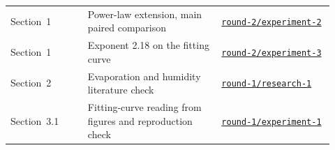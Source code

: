 \documentclass[11pt,letterpaper]{article}
\begin{document}
\begin{longtable}{p{0.22\linewidth}p{0.38\linewidth}p{0.32\linewidth}}
  Section~1 & Power-law extension, main paired comparison & \href{https://github.com/ai-inventor-papers/ai-invention-5821c4-newtons-cooling-law-for-coffee-over-30/tree/main/round-2/experiment-2}{\texttt{round-2/experiment-2}} \\
  Section~1 & Exponent 2.18 on the fitting curve & \href{https://github.com/ai-inventor-papers/ai-invention-5821c4-newtons-cooling-law-for-coffee-over-30/tree/main/round-2/experiment-3}{\texttt{round-2/experiment-3}} \\
  Section~2 & Evaporation and humidity literature check & \href{https://github.com/ai-inventor-papers/ai-invention-5821c4-newtons-cooling-law-for-coffee-over-30/tree/main/round-1/research-1}{\texttt{round-1/research-1}} \\
  Section~3.1 & Fitting-curve reading from figures and reproduction check & \href{https://github.com/ai-inventor-papers/ai-invention-5821c4-newtons-cooling-law-for-coffee-over-30/tree/main/round-1/experiment-1}{\texttt{round-1/experiment-1}} \\
  \bottomrule
\end{longtable}
\end{document}
